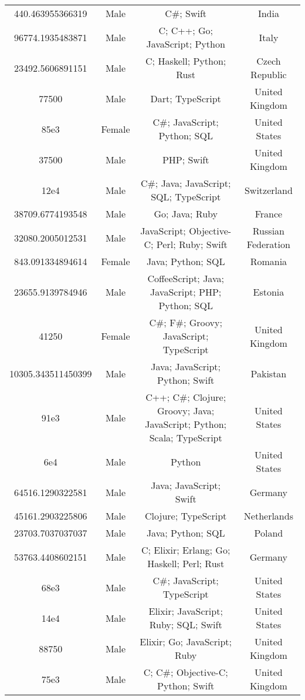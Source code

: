\begin{center}
\begin{tabular}{ |c|c|c|c| }
440.463955366319  &  Male  &  C\#; Swift  &  India  \\ 
96774.1935483871  &  Male  &  C; C++; Go; JavaScript; Python  &  Italy  \\ 
23492.5606891151  &  Male  &  C; Haskell; Python; Rust  &  Czech Republic  \\ 
77500  &  Male  &  Dart; TypeScript  &  United Kingdom  \\ 
85e3  &  Female  &  C\#; JavaScript; Python; SQL  &  United States  \\ 
37500  &  Male  &  PHP; Swift  &  United Kingdom  \\ 
12e4  &  Male  &  C\#; Java; JavaScript; SQL; TypeScript  &  Switzerland  \\ 
38709.6774193548  &  Male  &  Go; Java; Ruby  &  France  \\ 
32080.2005012531  &  Male  &  JavaScript; Objective-C; Perl; Ruby; Swift  &  Russian Federation  \\ 
843.091334894614  &  Female  &  Java; Python; SQL  &  Romania  \\ 
23655.9139784946  &  Male  &  CoffeeScript; Java; JavaScript; PHP; Python; SQL  &  Estonia  \\ 
41250  &  Female  &  C\#; F\#; Groovy; JavaScript; TypeScript  &  United Kingdom  \\ 
10305.343511450399  &  Male  &  Java; JavaScript; Python; Swift  &  Pakistan  \\ 
91e3  &  Male  &  C++; C\#; Clojure; Groovy; Java; JavaScript; Python; Scala; TypeScript  &  United States  \\ 
6e4  &  Male  &  Python  &  United States  \\ 
64516.1290322581  &  Male  &  Java; JavaScript; Swift  &  Germany  \\ 
45161.2903225806  &  Male  &  Clojure; TypeScript  &  Netherlands  \\ 
23703.7037037037  &  Male  &  Java; Python; SQL  &  Poland  \\ 
53763.4408602151  &  Male  &  C; Elixir; Erlang; Go; Haskell; Perl; Rust  &  Germany  \\ 
68e3  &  Male  &  C\#; JavaScript; TypeScript  &  United States  \\ 
14e4  &  Male  &  Elixir; JavaScript; Ruby; SQL; Swift  &  United States  \\ 
88750  &  Male  &  Elixir; Go; JavaScript; Ruby  &  United Kingdom  \\ 
75e3  &  Male  &  C; C\#; Objective-C; Python; Swift  &  United Kingdom  \\ 

\end{tabular}
\end{center}
